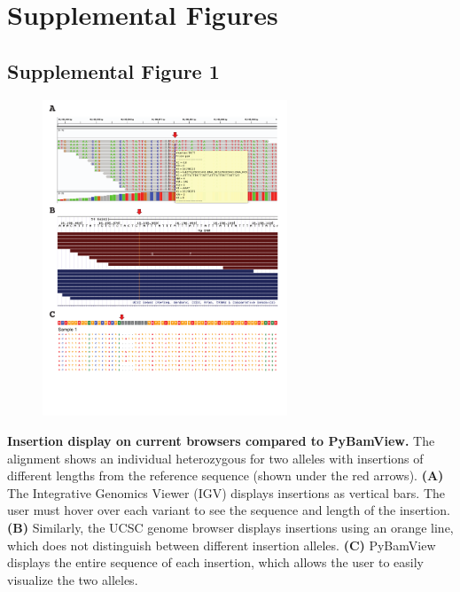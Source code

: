 \pagebreak
\section{Supplemental Figures}

\subsection{Supplemental Figure 1}
\begin{figure}[h!]
\centering
\label{fig:pbvsup1}
\includegraphics[width=0.65\textwidth]{Figures/App2/SuppFig1.pdf}
\end{figure}
\textbf{Insertion display on current browsers compared to PyBamView.} The alignment shows an individual heterozygous for two alleles with insertions of different lengths from the reference sequence (shown under the red arrows). \textbf{(A)} The Integrative Genomics Viewer (IGV) displays insertions as vertical bars. The user must hover over each variant to see the sequence and length of the insertion. \textbf{(B)} Similarly, the UCSC genome browser displays insertions using an orange line, which does not distinguish between different insertion alleles. \textbf{(C)} PyBamView displays the entire sequence of each insertion, which allows the user to easily visualize the two alleles.

\pagebreak

